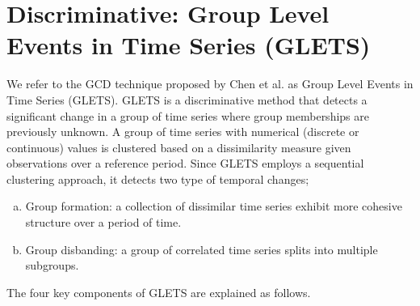 \section{ Discriminative: Group Level Events in Time Series (GLETS) }
We refer to the GCD technique proposed by 
Chen et al. \cite{GLETS} as Group Level Events in Time Series (GLETS). GLETS is a discriminative method that detects a significant change in a group of time series where group memberships are previously unknown. A group of time series with numerical (discrete or continuous) values is clustered based on a dissimilarity measure given  observations over a reference period. Since GLETS employs a sequential clustering approach, it detects two type of temporal changes;
\begin{enumerate}[(a)]
\item Group formation:  a collection of dissimilar time series exhibit more cohesive structure over a period of time. %
\item Group disbanding:  a group of correlated time series splits into multiple subgroups. %
\end{enumerate}
The four key components of GLETS are explained as follows. 

